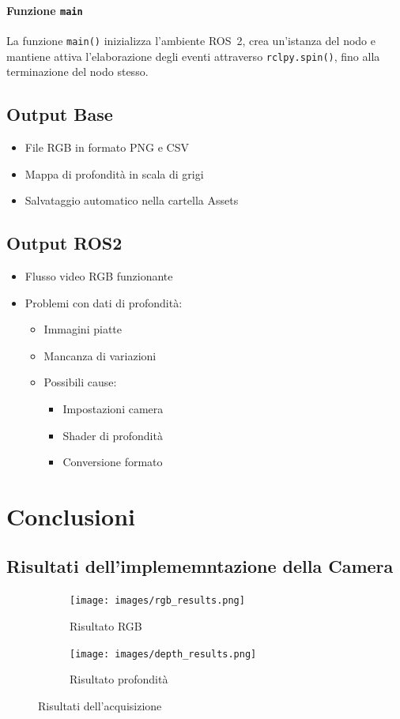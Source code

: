 \documentclass[11pt]{report}
\begin{document}
\paragraph{Funzione \texttt{main}}
La funzione \texttt{main()} inizializza l'ambiente ROS~2, crea un’istanza del nodo e mantiene attiva l’elaborazione degli eventi attraverso \texttt{rclpy.spin()}, fino alla terminazione del nodo stesso.

\subsection{Output Base}
\begin{itemize}
\item File RGB in formato PNG e CSV
\item Mappa di profondità in scala di grigi
\item Salvataggio automatico nella cartella Assets
\end{itemize}

\subsection{Output ROS2}
\begin{itemize}
\item Flusso video RGB funzionante
\item Problemi con dati di profondità:
\begin{itemize}
    \item Immagini piatte
    \item Mancanza di variazioni
    \item Possibili cause:
    \begin{itemize}
        \item Impostazioni camera
        \item Shader di profondità
        \item Conversione formato
    \end{itemize}
\end{itemize}
\end{itemize}

\section{Conclusioni}
\subsection{Risultati dell'implememntazione della Camera}
\begin{figure}[H]
    \centering
    \begin{subfigure}{0.45\textwidth}
        \centering
        \texttt{[image: images/rgb\_results.png]}
        \caption{Risultato RGB}
    \end{subfigure}
    \begin{subfigure}{0.45\textwidth}
        \centering
        \texttt{[image: images/depth\_results.png]}
        \caption{Risultato profondità}
    \end{subfigure}
    \caption{Risultati dell'acquisizione}
    \label{fig:results}
\end{figure}
\end{document}
